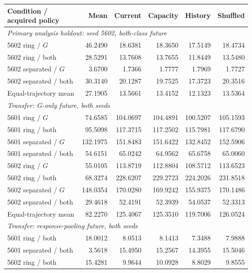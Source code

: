 \begin{table}[p]
\centering\small
\setlength{\tabcolsep}{4pt}
\begin{tabular}{lrrrrr}
\toprule
Condition / acquired policy & Mean & Current & Capacity & History & Shuffled \\
\midrule
\multicolumn{6}{l}{\textit{Primary analysis holdout: seed 5602, both-class future}} \\
5602 ring / $G$ & 46.2490 & 18.6381 & 18.3650 & 17.5149 & 18.4734 \\
5602 ring / both & 28.5291 & 13.7608 & 13.7655 & 11.8449 & 13.5480 \\
5602 separated / $G$ & 3.6700 & 1.7366 & 1.7777 & 1.7969 & 1.7727 \\
5602 separated / both & 30.3140 & 20.1287 & 19.7525 & 17.3723 & 20.3516 \\
Equal-trajectory mean & 27.1905 & 13.5661 & 13.4152 & 12.1323 & 13.5364 \\
\midrule
\multicolumn{6}{l}{\textit{Transfer: G-only future, both seeds}} \\
5601 ring / $G$ & 74.6585 & 104.0697 & 104.4891 & 100.5207 & 105.1593 \\
5601 ring / both & 95.5098 & 117.3715 & 117.2502 & 115.7981 & 117.6790 \\
5601 separated / $G$ & 132.1975 & 151.8483 & 151.6422 & 132.8452 & 152.5906 \\
5601 separated / both & 54.6151 & 65.0242 & 64.9562 & 65.6758 & 65.0060 \\
5602 ring / $G$ & 55.0105 & 113.8719 & 112.8804 & 108.5712 & 113.6523 \\
5602 ring / both & 68.3274 & 228.6207 & 229.2723 & 224.2026 & 231.8518 \\
5602 separated / $G$ & 148.0354 & 170.0280 & 169.9242 & 155.9375 & 170.1486 \\
5602 separated / both & 29.4618 & 52.4191 & 52.3939 & 54.0537 & 52.3313 \\
Equal-trajectory mean & 82.2270 & 125.4067 & 125.3510 & 119.7006 & 126.0524 \\
\midrule
\multicolumn{6}{l}{\textit{Transfer: response-pooling future, both seeds}} \\
5601 ring / both & 18.0012 & 8.0513 & 8.1413 & 7.3488 & 7.9888 \\
5601 separated / both & 3.5618 & 15.4950 & 15.2567 & 14.3955 & 15.5046 \\
5602 ring / both & 15.4281 & 9.9644 & 10.0928 & 8.8029 & 9.8555 \\

\end{tabular}
\end{table}
